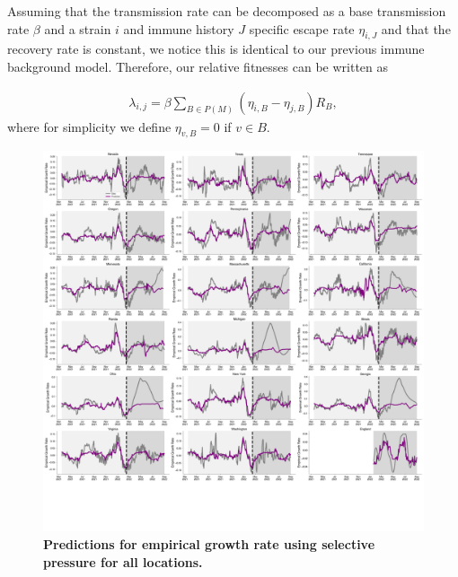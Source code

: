 \documentclass[12pt,oneside,letterpaper]{article}
\begin{document}
Assuming that the transmission rate can be decomposed as a base transmission rate $\beta$ and a strain $i$ and immune history $J$ specific escape rate $\eta_{i, J}$ and that the recovery rate is constant, we notice this is identical to our previous immune background model.
Therefore, our relative fitnesses can be written as

\begin{align*}
    \lambda_{i, j} = \beta \sum_{B \in P(M)} (\eta_{i, B} - \eta_{j, B}) R_{B},
\end{align*}
where for simplicity we define $\eta_{v, B} = 0$ if $v \in B$.

    \begin{figure}[t!]
        \centering
        \includegraphics[width=0.9\textwidth=0.01]{./supplementary_figures/empirical-growth-rate-predictions-all.png}
        \caption{
            \textbf{Predictions for empirical growth rate using selective pressure for all locations.}
        }
        \label{fig:empirical-growth-rate-predictions-all}
    \end{figure}
\end{document}
